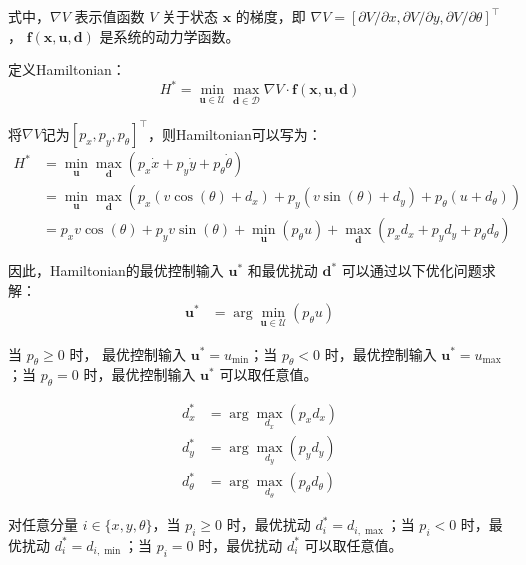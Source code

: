 \documentclass[11pt]{ctexrep}
\begin{document}
式中，$\nabla V$ 表示值函数 $V$ 关于状态 $\mathbf{x}$ 的梯度，即
$\nabla V = [\partial V / \partial x, \partial V / \partial y, \partial V / \partial \theta]^\top$，
$\mathbf{f}(\mathbf{x},\mathbf{u},\mathbf{d})$ 是系统的动力学函数。


定义Hamiltonian：
\begin{equation}
H^* = \min_{\mathbf{u} \in \mathcal{U}} \max_{\mathbf{d} \in \mathcal{D}} \nabla V \cdot \mathbf{f}(\mathbf{x},\mathbf{u},\mathbf{d})
\end{equation}

将$\nabla V$记为$[p_x, p_y, p_{\theta}]^\top$，则Hamiltonian可以写为：
\begin{equation}
\begin{aligned}
    H^* &= \min_{\mathbf{u}}\max_{\mathbf{d}} \left( p_x \dot{x} + p_y \dot{y} +p_{\theta} \dot{\theta} \right)\\
    &= \min_{\mathbf{u}}\max_{\mathbf{d}} \left( p_x (v \cos(\theta) + d_x) + p_y (v \sin(\theta) + d_y) +p_{\theta} (u + d_{\theta}) \right)\\
    &= p_x v \cos(\theta) + p_y v \sin(\theta)
    + \min_{\mathbf{u}} (p_{\theta} u)
    + \max_{\mathbf{d}} (p_x d_x + p_y d_y + p_{\theta} d_{\theta})
\end{aligned}
\end{equation}

因此，Hamiltonian的最优控制输入 $\mathbf{u}^*$ 和最优扰动 $\mathbf{d}^*$ 可以通过以下优化问题求解：
\begin{equation}
\begin{aligned}
\mathbf{u}^* &= \arg\min_{\mathbf{u} \in \mathcal{U}} (p_{\theta} u) 
\end{aligned}
\end{equation}

当 $p_{\theta} \ge 0$ 时， 最优控制输入 $\mathbf{u}^* = u_{\min}$；当 $p_{\theta} < 0$ 时，最优控制输入 $\mathbf{u}^* = u_{\max}$；当 $p_{\theta} = 0$ 时，最优控制输入 $\mathbf{u}^*$ 可以取任意值。


\begin{equation}
\begin{aligned}
d_x^* &= \arg\max_{d_x} (p_x d_x) \\
d_y^* &= \arg\max_{d_y} (p_y d_y) \\
d_{\theta}^* &= \arg\max_{d_{\theta}} (p_{\theta} d_{\theta})
\end{aligned}
\end{equation}

对任意分量 $i \in \{x,y,\theta\}$，当 $p_i \ge 0$ 时，最优扰动 $d_i^* = d_{i,\max}$；当 $p_i < 0$ 时，最优扰动 $d_i^* = d_{i,\min}$；当 $p_i = 0$ 时，最优扰动 $d_i^*$ 可以取任意值。
\end{document}
